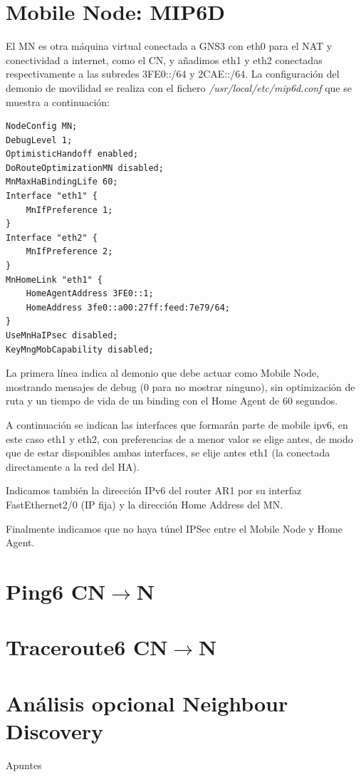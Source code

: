 \documentclass{article}
\begin{document}
\section{Mobile Node: MIP6D}

El MN es otra máquina virtual conectada a GNS3 con eth0 para el NAT y conectividad a internet, como el CN, y añadimos eth1 y eth2 conectadas respectivamente a las subredes 3FE0::/64 y 2CAE::/64. La configuración del demonio de movilidad se realiza con el fichero \textit{/usr/local/etc/mip6d.conf} que se muestra a continuación:

\begin{lstlisting}
NodeConfig MN;
DebugLevel 1;
OptimisticHandoff enabled;
DoRouteOptimizationMN disabled;
MnMaxHaBindingLife 60;
Interface "eth1" {
	MnIfPreference 1;
}
Interface "eth2" {
	MnIfPreference 2;
}
MnHomeLink "eth1" {
	HomeAgentAddress 3FE0::1;
	HomeAddress 3fe0::a00:27ff:feed:7e79/64;
}
UseMnHaIPsec disabled;
KeyMngMobCapability disabled;
\end{lstlisting}

La primera línea indica al demonio que debe actuar como Mobile Node, mostrando mensajes de debug (0 para no mostrar ninguno), sin optimización de ruta y un tiempo de vida de un binding con el Home Agent de 60 segundos.

A continuación se indican las interfaces que formarán parte de mobile ipv6, en este caso eth1 y eth2, con preferencias de a menor valor se elige antes, de modo que de estar disponibles ambas interfaces, se elije antes eth1 (la conectada directamente a la red del HA).

Indicamos también la dirección IPv6 del router AR1 por su interfaz FastEthernet2/0 (IP fija) y la dirección Home Address del MN.

Finalmente indicamos que no haya túnel IPSec entre el Mobile Node y Home Agent.



\section{Ping6 CN\texorpdfstring{$\rightarrow$}MN}


\section{Traceroute6 CN\texorpdfstring{$\rightarrow$}MN}


\section{Análisis opcional Neighbour Discovery}




\begin{thebibliography}{99}
	Apuntes
\end{thebibliography}
\end{document}
